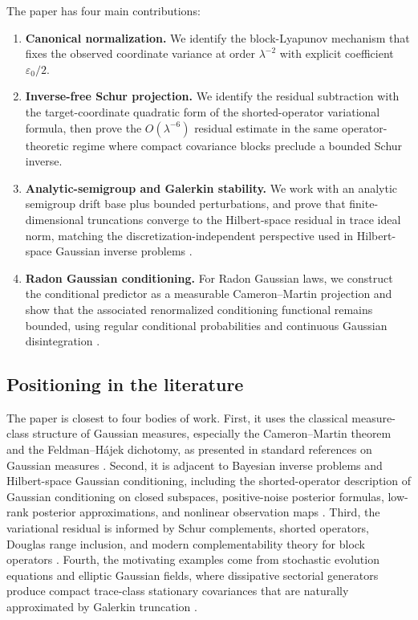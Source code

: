 \documentclass[11pt]{amsart}
\theoremstyle{plain}
\theoremstyle{definition}
\theoremstyle{remark}
\begin{document}
The paper has four main contributions:
\begin{enumerate}
  \item \textbf{Canonical normalization.} We identify the block-Lyapunov mechanism that fixes the observed coordinate variance at order $\lambda^{-2}$ with explicit coefficient $\varepsilon_0/2$.
  \item \textbf{Inverse-free Schur projection.} We identify the residual subtraction with the target-coordinate quadratic form of the shorted-operator variational formula, then prove the $O(\lambda^{-6})$ residual estimate in the same operator-theoretic regime where compact covariance blocks preclude a bounded Schur inverse.
  \item \textbf{Analytic-semigroup and Galerkin stability.} We work with an analytic semigroup drift base plus bounded perturbations, and prove that finite-dimensional truncations converge to the Hilbert-space residual in trace ideal norm, matching the discretization-independent perspective used in Hilbert-space Gaussian inverse problems \cite{stuart2010inverse,carerelie2024optimal,carerelie2025posterior}.
  \item \textbf{Radon Gaussian conditioning.} For Radon Gaussian laws, we construct the conditional predictor as a measurable Cameron--Martin projection and show that the associated renormalized conditioning functional remains bounded, using regular conditional probabilities and continuous Gaussian disintegration \cite{bogachev1998gaussian,lagatta2013continuous,steinwart2024conditioning}.
\end{enumerate}

\subsection{Positioning in the literature}
\label{sec:related}

The paper is closest to four bodies of work.  First, it uses the classical measure-class structure of Gaussian measures, especially the Cameron--Martin theorem and the Feldman--H\'{a}jek dichotomy, as presented in standard references on Gaussian measures \cite{feldman1958equivalence,hajek1958property,bogachev1998gaussian}.  Second, it is adjacent to Bayesian inverse problems and Hilbert-space Gaussian conditioning, including the shorted-operator description of Gaussian conditioning on closed subspaces, positive-noise posterior formulas, low-rank posterior approximations, and nonlinear observation maps \cite{owhadi2015conditioning,stuart2010inverse,chen2024gaussian,steinwart2024conditioning,carerelie2024optimal,carerelie2025posterior}.  Third, the variational residual is informed by Schur complements, shorted operators, Douglas range inclusion, and modern complementability theory for block operators \cite{krein1947selfadjoint,anderson1975shorted,douglas1966majorization,tretter2008spectral,contino2018schur,friedrich2017generalized,hassi2023complementation}.  Fourth, the motivating examples come from stochastic evolution equations and elliptic Gaussian fields, where dissipative sectorial generators produce compact trace-class stationary covariances that are naturally approximated by Galerkin truncation \cite{daprato2014stochastic,lord2014introduction,simon2005trace}.
\end{document}
